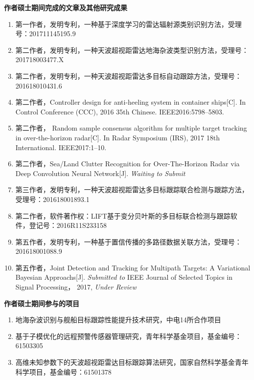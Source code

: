 
\textbf{\Large{作者硕士期间完成的文章及其他研究成果}}
\begin{enumerate}
\item 第一作者，发明专利，一种基于深度学习的雷达辐射源类别识别方法，受理号：201711145195.9

\item 第二作者，发明专利，一种天波超视距雷达地海杂波类型识别方法，受理号：201718003477.X

\item 第二作者，发明专利，一种天波超视距雷达多目标自动跟踪方法，受理号：201618010431.6

\item 第二作者，Controller design for anti-heeling system in container ships[C]. In Control Conference (CCC), 2016 35th Chinese. IEEE2016:5798–5803.

\item 第二作者， Random sample consensus algorithm for multiple target tracking in over-the-horizon radar[C]. In Radar Symposium (IRS), 2017 18th International. IEEE2017:1–10.

\item 第二作者，Sea/Land Clutter Recognition for Over-The-Horizon Radar via Deep Convolution Neural Network[J]. \textit{Waiting to Submit}

\item 第三作者，发明专利，一种天波超视距雷达多目标跟踪联合检测与跟踪方法，受理号：201618001893.1

\item 第二作者，软件著作权：LIFT\underline{\hspace{0.5em}}基于变分贝叶斯的多目标联合检测与跟踪软件，登记号：2016R11S233158

\item 第五作者，发明专利，一种基于置信传播的多路径数据关联方法，受理号：201618001088.9

\item 第五作者，Joint Detection and Tracking for Multipath Targets: A Variational Bayesian Approachs[J]. \textit{Submitted to } IEEE Journal of Selected Topics in Signal Processing， 2017, \textit{Under Review}

\end{enumerate}

\textbf{\Large{作者硕士期间参与的项目}}

\begin{enumerate}

\item 地海杂波识别与舰船目标跟踪性能提升技术研究，中电14所合作项目

\item 基于子模优化的远程预警传感器管理研究，青年科学基金项目，基金编号：61503305

\item 高维未知参数下的天波超视距雷达目标跟踪算法研究，国家自然科学基金青年科学项目，基金编号：61501378

\end{enumerate}